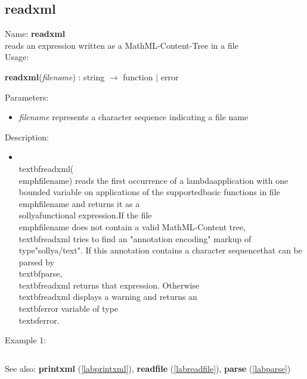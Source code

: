 \subsection{readxml}
\label{labreadxml}
\noindent Name: \textbf{readxml}\\
reads an expression written as a MathML-Content-Tree in a file\\
\noindent Usage: 
\begin{center}
\textbf{readxml}(\emph{filename}) : \textsf{string} $\rightarrow$ \textsf{function} $|$ \textsf{error}\\
\end{center}
Parameters: 
\begin{itemize}
\item \emph{filename} represents a character sequence indicating a file name
\end{itemize}
\noindent Description: \begin{itemize}

\item \\textbf{readxml}(\\emph{filename}) reads the first occurrence of a lambda\n   application with one bounded variable on applications of the supported\n   basic functions in file \\emph{filename} and returns it as a \\sollya\n   functional expression.\n    \n   If the file \\emph{filename} does not contain a valid MathML-Content tree,\n   \\textbf{readxml} tries to find an "annotation encoding" markup of type\n   "sollya/text". If this annotation contains a character sequence\n   that can be parsed by \\textbf{parse}, \\textbf{readxml} returns that expression.  Otherwise\n   \\textbf{readxml} displays a warning and returns an \\textbf{error} variable of type\n   \\textsf{error}.\n\end{itemize}
\noindent Example 1: 
\begin{center}\begin{minipage}{15cm}\begin{Verbatim}[frame=single]
\end{Verbatim}
\end{minipage}\end{center}
See also: \textbf{printxml} (\ref{labprintxml}), \textbf{readfile} (\ref{labreadfile}), \textbf{parse} (\ref{labparse})
